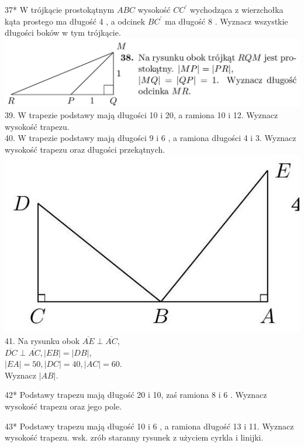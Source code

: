 \documentclass[10pt]{article}
\begin{document}
37* W trójkącie prostokątnym \(A B C\) wysokość \(C C^{\prime}\) wychodząca z wierzchołka kąta prostego ma długość 4 , a odcinek \(B C^{\prime}\) ma długość 8 . Wyznacz wszystkie długości boków w tym trójkącie.\\
\includegraphics[max width=\textwidth, center]{2024_11_21_71f62bd117d375398909g-129(2)}\\
39. W trapezie podstawy mają długości 10 i 20, a ramiona 10 i 12. Wyznacz wysokość trapezu.\\
40. W trapezie podstawy mają długości 9 i 6 , a ramiona długości 4 i 3. Wyznacz wysokość trapezu oraz długości przekątnych.\\
\includegraphics[max width=\textwidth, center]{2024_11_21_71f62bd117d375398909g-129(1)}\\
41. Na rysunku obok \(\overline{A E} \perp \overline{A C}\),\\
\(\overline{D C} \perp \overline{A C},|E B|=|D B|\),\\
\(|E A|=50,|D C|=40,|A C|=60\).\\
Wyznacz \(|A B|\).

42* Podstawy trapezu mają długość 20 i 10, zaś ramiona 8 i 6 . Wyznacz wysokość trapezu oraz jego pole.

43* Podstawy trapezu mają długość 10 i 6 , a ramiona długość 13 i 11. Wyznacz wysokość trapezu. wsk. zrób staranny rysunek z użyciem cyrkla i linijki.
\end{document}
